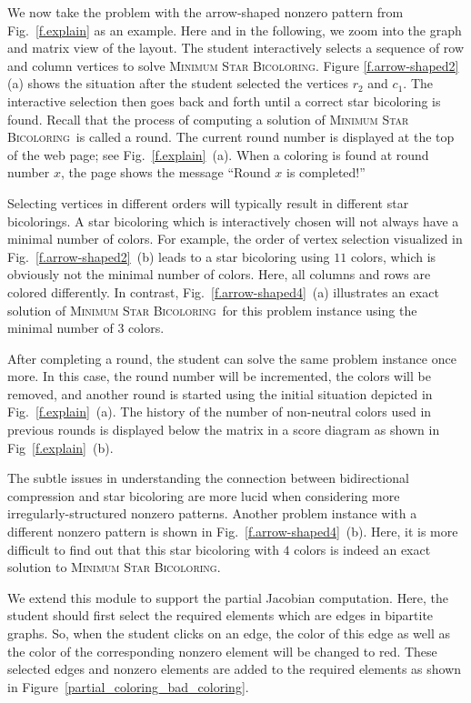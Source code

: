 \documentclass[12pt, twoside,a4paper,toc=bibliography]{scrbook}
\newcommand{\MinStaBic}{\textsc{Minimum Star Bicoloring}}
\begin{document}
We now take the problem with the arrow-shaped nonzero pattern from Fig.~\ref{f.explain}
as an example. Here and in the following, we zoom into the graph and matrix view of the
layout. The student interactively selects a sequence of row and column vertices to solve
\MinStaBic. Figure \ref{f.arrow-shaped2} (a) shows the situation after the student
selected the vertices $r_2$ and $c_1$.
The interactive selection then goes back and forth until a correct star bicoloring is
found. Recall that the process of computing a solution of \MinStaBic\ is called a round.
The current round number is displayed at the top of the web page; see
Fig.~\ref{f.explain}~(a). When a coloring is found at round number $x$, the page shows
the message ``Round $x$ is completed!''

Selecting vertices in different orders will typically result in different star
bicolorings. A star bicoloring which is interactively chosen will not always have a
minimal number of colors. For example, the order of vertex selection visualized in
Fig.~\ref{f.arrow-shaped2}~(b) leads to a star bicoloring using $11$ colors, which is
obviously not the minimal number of colors. Here, all columns and rows are colored
differently. In contrast, Fig.~\ref{f.arrow-shaped4}~(a) illustrates an exact solution of
\MinStaBic\ for this problem instance using the minimal number of $3$ colors.

After completing a round, the student can solve the same problem instance once more. In
this case, the round number will be incremented, the colors will be removed, and another
round is started using the initial situation depicted in Fig.~\ref{f.explain}~(a). The
history of the number of non-neutral colors used in previous rounds is displayed below
the matrix in a score diagram as shown in Fig~\ref{f.explain}~(b).

The subtle issues in understanding the connection between bidirectional compression and
star bicoloring are more lucid when considering more irregularly-structured nonzero
patterns. Another problem instance with a different nonzero pattern is shown in
Fig.~\ref{f.arrow-shaped4}~(b). Here, it is more difficult to find out that this star
bicoloring with $4$ colors is indeed an exact solution to \MinStaBic.

We extend this module to support
the partial Jacobian computation. Here, the student should
first select the required elements which are edges in bipartite graphs.
So, when the student clicks on an edge, the color of this edge
as well as the color of the corresponding nonzero element will be changed to red.
These selected edges and nonzero elements are added to the required elements
as shown in Figure~\ref{partial_coloring_bad_coloring}.
\end{document}
